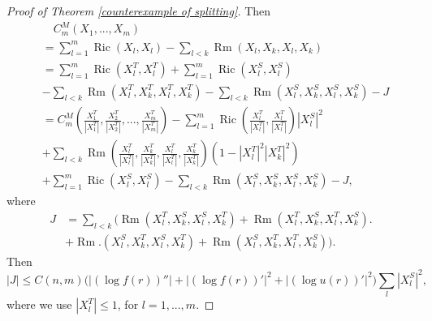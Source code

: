 \documentclass[11pt,letterpaper]{amsart}
\DeclareMathOperator{\Ric}{Ric}
\theoremstyle{definition}
\theoremstyle{remark}
\numberwithin{equation}{section}
\begin{document}
\begin{proof}[Proof of Theorem \ref{counterexample of splitting}]
Then 
\[
\begin{aligned}
&\quad C^M_m(X_{1},...,X_{m})\\
&=\sum_{l=1}^{m}\Ric(X_{l},X_{l})-\sum_{l<k}\operatorname{Rm}(X_{l},X_{k},X_{l},X_{k})\\
&=\sum_{l=1}^{m}\Ric(X_{l}^{T},X_{l}^T)+\sum_{l=1}^{m}\Ric(X_{l}^{S},X_{l}^S)\\
&-\sum_{l<k}\operatorname{Rm}(X_{l}^T,X_{k}^T,X_{l}^T,X_{k}^T)-\sum_{l<k}\operatorname{Rm}(X_{l}^S,X_{k}^S,X_{l}^S,X_{k}^S)-J\\
&=C_{m}^{M}(\frac{X_{1}^{T}}{|X_{1}^{T}|},\frac{X_{2}^{T}}{|X_{2}^{T}|},...,\frac{X_{m}^{T}}{|X_{m}^{T}|})-\sum_{l=1}^{m}\Ric(\frac{X_{l}^{T}}{|X_{l}^{T}|},\frac{X_{l}^{T}}{|X_{l}^{T}|})|X_{l}^{S}|^2\\
&+\sum_{l<k}\operatorname{Rm}(\frac{X_{l}^{T}}{|X_{l}^{T}|},\frac{X_{k}^{T}}{|X_{k}^{T}|},\frac{X_{l}^{T}}{|X_{l}^{T}|},\frac{X_{k}^{T}}{|X_{k}^{T}|})(1-|X_{l}^{T}|^2|X_{k}^{T}|^2)\\
&+\sum_{l=1}^{m}\Ric(X_{l}^{S},X_{l}^S)
-\sum_{l<k}\operatorname{Rm}(X_{l}^S,X_{k}^S,X_{l}^S,X_{k}^S)-J,
\end{aligned}
\]
where 
\[
\begin{aligned}
J
&=\sum_{l<k}\Big(\operatorname{Rm}(X_{l}^T,X_{k}^S,X_{l}^S,X_{k}^T)+\operatorname{Rm}(X_{l}^T,X_{k}^S,X_{l}^T,X_{k}^S)\Big.\\
&+\operatorname{Rm}\Big.(X_{l}^S,X_{k}^T,X_{l}^S,X_{k}^T)+\operatorname{Rm}(X_{l}^S,X_{k}^T,X_{l}^T,X_{k}^S)\Big).
\end{aligned}
\]
Then 
\begin{equation}\label{es_J}
|J|\leq C(n,m)\Big(\big|(\log f(r))''\big|+\big|(\log f(r))'\big|^2+\big|(\log u(r))'\big|^2\Big)\sum_{l}|X_{l}^S|^2,
\end{equation}
where we use $|X_{l}^T|\leq 1$, for $l=1,...,m$.


\end{proof}
\end{document}
